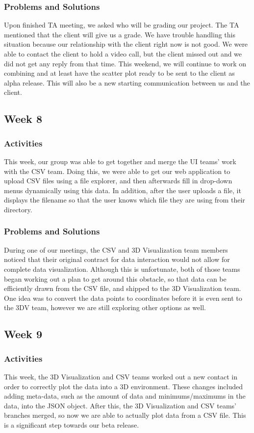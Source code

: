 \documentclass[journal,10pt,onecolumn,compsoc]{IEEEtran} \usepackage[margin=1.0in]{geometry} \usepackage{pdfpages}
\begin{document}
    \subsubsection{Problems and Solutions}
    Upon finished TA meeting, we asked who will be grading our project. The TA mentioned that the client will give us a grade. We have trouble handling this situation because our relationship with the client right now is not good. We were able to contact the client to hold a video call, but the client missed out and we did not get any reply from that time. This weekend, we will continue to work on combining and at least have the scatter plot ready to be sent to the client as alpha release. This will also be a new starting communication between us and the client.
 
 \subsection{Week 8}
    \subsubsection{Activities}
    This week, our group was able to get together and merge the UI teams' work with the CSV team. Doing this, we were able to get our web application to upload CSV files using a file explorer, and then afterwards fill in drop-down menus dynamically using this data. In addition, after the user uploads a file, it displays the filename so that the user knows which file they are using from their directory.
    \subsubsection{Problems and Solutions}
    During one of our meetings, the CSV and 3D Visualization team members noticed that their original contract for data interaction would not allow for complete data visualization. Although this is unfortunate, both of those teams began working out a plan to get around this obstacle, so that data can be efficiently drawn from the CSV file, and shipped to the 3D Visualization team. One idea was to convert the data points to coordinates before it is even sent to the 3DV team, however we are still exploring other options as well. 

    \subsection{Week 9}
    \subsubsection{Activities}
    This week, the 3D Visualization and CSV teams worked out a new contact in order to correctly plot the data into a 3D environment. These changes included adding meta-data, such as the amount of data and minimums/maximums in the data, into the JSON object. After this, the 3D Visualization and CSV teams' branches merged, so now we are able to actually plot data from a CSV file. This is a significant step towards our beta release. 
\end{document}
